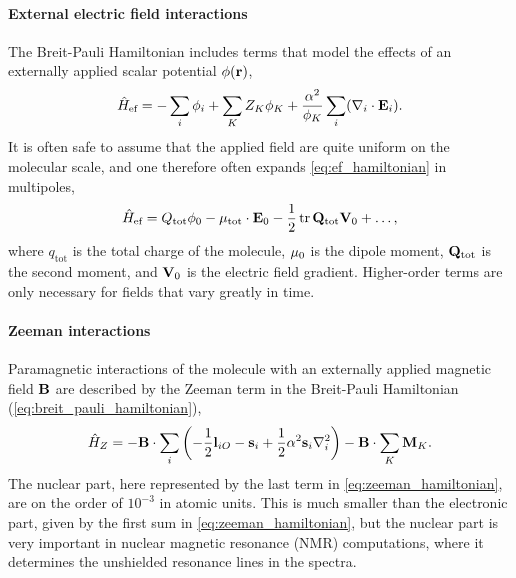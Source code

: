     \paragraph{External electric field interactions}
    The Breit-Pauli Hamiltonian includes terms that model the effects of an externally
    applied scalar potential $\phi(\vb{r})$,
    \begin{equation}
        \label{eq:ef_hamiltonian}
        \hat{H}_{\text{ef}}
            = - \sum_i \phi_i
              + \sum_K Z_K\phi_K
              + \frac{\alpha^2}{\phi_K} \sum_i (\nabla_i \cdot \vb{E}_i).
    \end{equation}
    It is often safe to assume that the applied field are quite uniform on the
    molecular scale, and one therefore often expands \autoref{eq:ef_hamiltonian}
    in multipoles,
    \begin{equation}
        \hat{H}_{\text{ef}}
            = Q_{\text{tot}}\phi_0 
            - \vb{\mu}_{\text{tot}} \cdot \vb{E}_0
            - \frac{1}{2}\tr \vb{Q}_{\text{tot}}\vb{V}_0
            + \dots,
    \end{equation}
    where $q_{\text{tot}}$ is the total charge of the molecule, $\vb{\mu}_0$ is the 
    dipole moment, $\vb{Q}_{\text{tot}}$ is the second moment, and $\vb{V}_0$ is the
    electric field gradient. Higher-order terms are only necessary for fields that vary
    greatly in time.

    \paragraph{Zeeman interactions}
    Paramagnetic interactions of the molecule with an externally applied magnetic field
    $\vb{B}$ are described by the Zeeman term in the Breit-Pauli Hamiltonian
    (\autoref{eq:breit_pauli_hamiltonian}),
    \begin{equation}
        \label{eq:zeeman_hamiltonian}
        \hat{H}_Z
            = - \vb{B} \cdot \sum_i \left(
                - \frac{1}{2}\vb{l}_{iO} - \vb{s}_i
                + \frac{1}{2}\alpha^2\vb{s}_i\nabla_i^2
            \right)
            - \vb{B} \cdot \sum_K \vb{M}_K.
    \end{equation} 
    The nuclear part, here represented by the last term in \autoref{eq:zeeman_hamiltonian},
    are on the order of $10^{-3}$ in atomic units. This is much smaller than the electronic
    part, given by the first sum in \autoref{eq:zeeman_hamiltonian}, but the nuclear part is 
    very important in nuclear magnetic resonance (NMR) computations, where it determines the
    unshielded resonance lines in the spectra. 

